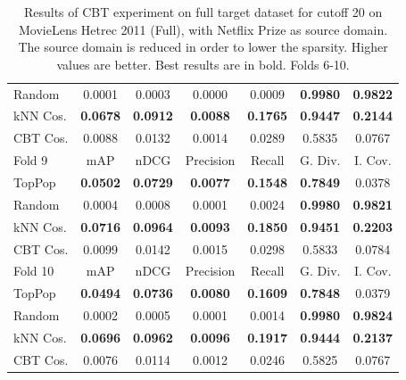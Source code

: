 \begin{table}[hbt]
\begin{tabulary}{\textwidth}{|L|CCCCCC|}
Random & 0.0001 &           0.0003 &           0.0000 &           0.0009 &                                  \textbf{0.9980} &                                   \textbf{0.9822} \\
kNN Cos. & \textbf{0.0678} &  \textbf{0.0912} &  \textbf{0.0088} &  \textbf{0.1765} &                                  \textbf{0.9447} &                                   \textbf{0.2144} \\
CBT Cos. & 0.0088 &           0.0132 &           0.0014 &           0.0289 &                                           0.5835 &                                            0.0767 \\
\hline
\hline
Fold 9 & mAP & nDCG & Precision & Recall & G. Div. & I. Cov. \\
\hline
TopPop & \textbf{0.0502} &  \textbf{0.0729} &  \textbf{0.0077} &  \textbf{0.1548} &                                  \textbf{0.7849} &                                            0.0378 \\
Random & 0.0004 &           0.0008 &           0.0001 &           0.0024 &                                  \textbf{0.9980} &                                   \textbf{0.9821} \\
kNN Cos. & \textbf{0.0716} &  \textbf{0.0964} &  \textbf{0.0093} &  \textbf{0.1850} &                                  \textbf{0.9451} &                                   \textbf{0.2203} \\
CBT Cos. & 0.0099 &           0.0142 &           0.0015 &           0.0298 &                                           0.5833 &                                            0.0784 \\
\hline
\hline
Fold 10 & mAP & nDCG & Precision & Recall & G. Div. & I. Cov. \\
\hline
TopPop & \textbf{0.0494} &  \textbf{0.0736} &  \textbf{0.0080} &  \textbf{0.1609} &                                  \textbf{0.7848} &                                            0.0379 \\
Random & 0.0002 &           0.0005 &           0.0001 &           0.0014 &                                  \textbf{0.9980} &                                   \textbf{0.9824} \\
kNN Cos. & \textbf{0.0696} &  \textbf{0.0962} &  \textbf{0.0096} &  \textbf{0.1917} &                                  \textbf{0.9444} &                                   \textbf{0.2137} \\
CBT Cos. & 0.0076 &           0.0114 &           0.0012 &           0.0246 &                                           0.5825 &                                            0.0767 \\
\hline
\end{tabulary}
\caption{Results of CBT experiment on full target dataset for cutoff 20 on MovieLens Hetrec 2011 (Full), with Netflix Prize as source domain. The source domain is reduced in order to lower the sparsity. Higher values are better. Best results are in bold. Folds 6-10.}
\end{table}

